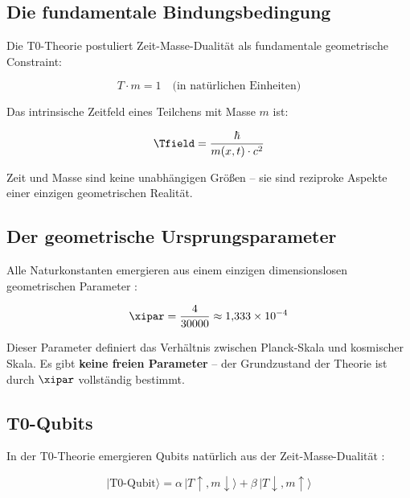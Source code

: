 \subsection{Die fundamentale Bindungsbedingung}

Die T0-Theorie postuliert Zeit-Masse-Dualität als fundamentale geometrische Constraint:

\begin{equation}
    T \cdot m = 1 \quad \text{(in natürlichen Einheiten)}
    \label{eq:t0_constraint}
\end{equation}

Das intrinsische Zeitfeld eines Teilchens mit Masse $m$ ist:

\begin{equation}
    \Tfield = \frac{\hbar}{m(x,t) \cdot c^2}
    \label{eq:t0_timefield}
\end{equation}

Zeit und Masse sind keine unabhängigen Größen -- sie sind reziproke Aspekte einer 
einzigen geometrischen Realität.

\subsection{Der geometrische Ursprungsparameter}

Alle Naturkonstanten emergieren aus einem einzigen dimensionslosen geometrischen 
Parameter \cite{pascher_xi_2025}:

\begin{equation}
    \xipar = \frac{4}{30000} \approx 1{,}333 \times 10^{-4}
    \label{eq:xi_param}
\end{equation}

Dieser Parameter definiert das Verhältnis zwischen Planck-Skala und kosmischer Skala.
Es gibt \textbf{keine freien Parameter} -- der Grundzustand der Theorie ist durch 
$\xipar$ vollständig bestimmt.

\subsection{T0-Qubits}

In der T0-Theorie emergieren Qubits natürlich aus der Zeit-Masse-Dualität 
\cite{pascher_quantum_2025}:

\begin{equation}
    |\text{T0-Qubit}\rangle = \alpha \, |T{\uparrow}, m{\downarrow}\rangle 
    + \beta \, |T{\downarrow}, m{\uparrow}\rangle
    \label{eq:t0_qubit}
\end{equation}

